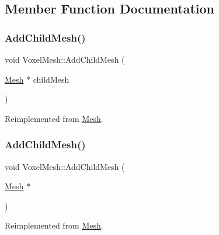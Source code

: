\subsection{Member Function Documentation}
\mbox{\label{class_voxel_mesh_a08d451f7ec199e9dcab9ab5ee0646b28}} 
\subsubsection{\texorpdfstring{AddChildMesh()}{AddChildMesh()}\hspace{0.1cm}{\footnotesize\ttfamily [1/2]}}
{\footnotesize\ttfamily void Voxel\+Mesh\+::\+Add\+Child\+Mesh (\begin{DoxyParamCaption}\item[{\mbox{\hyperlink{class_mesh}{Mesh}} $\ast$}]{child\+Mesh }\end{DoxyParamCaption})\hspace{0.3cm}{\ttfamily [virtual]}}



Reimplemented from \mbox{\hyperlink{class_mesh_a3f1bcf55b3058829dc7f3dcf260cd231}{Mesh}}.

\mbox{\label{class_voxel_mesh_a08d451f7ec199e9dcab9ab5ee0646b28}} 
\subsubsection{\texorpdfstring{AddChildMesh()}{AddChildMesh()}\hspace{0.1cm}{\footnotesize\ttfamily [2/2]}}
{\footnotesize\ttfamily void Voxel\+Mesh\+::\+Add\+Child\+Mesh (\begin{DoxyParamCaption}\item[{\mbox{\hyperlink{class_mesh}{Mesh}} $\ast$}]{ }\end{DoxyParamCaption})\hspace{0.3cm}{\ttfamily [virtual]}}



Reimplemented from \mbox{\hyperlink{class_mesh_a3f1bcf55b3058829dc7f3dcf260cd231}{Mesh}}.

\mbox{\label{class_voxel_mesh_ad8ef76698c07a4531ccdf7de9408f903}} 
